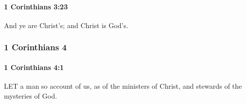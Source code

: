 		\paragraph{1 Corinthians 3:23} %
			\label{1CORINTHIANS-3-23}

			And ye are Christ's; and Christ is God's.

			\begin{framed}
			\scriptsize
				\begin{compactdesc}
					\item[SBLG] 
				\end{compactdesc}
			\end{framed}

	\subsubsection{1 Corinthians 4} %
		\label{1CORINTHIANS-4}
		
		\paragraph{1 Corinthians 4:1} %
			\label{1CORINTHIANS-4-1}

			LET a man so account of us, as of the ministers of Christ, and stewards of the mysteries of God.

